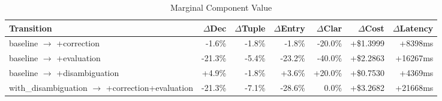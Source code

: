 \begin{table}[htbp]
\centering
\caption{Marginal Component Value}
\label{tab:marginal-deltas}
\begin{tabular}{l rrrr rr}
\toprule
Transition & $\Delta$Dec & $\Delta$Tuple & $\Delta$Entry & $\Delta$Clar & $\Delta$Cost & $\Delta$Latency \\
\midrule
  baseline $\to$ +correction & -1.6\% & -1.8\% & -1.8\% & -20.0\% & +\$1.3999 & +8398ms \\
  baseline $\to$ +evaluation & -21.3\% & -5.4\% & -23.2\% & -40.0\% & +\$2.2863 & +16267ms \\
  baseline $\to$ +disambiguation & +4.9\% & -1.8\% & +3.6\% & +20.0\% & +\$0.7530 & +4369ms \\
  with\_disambiguation $\to$ +correction+evaluation & -21.3\% & -7.1\% & -28.6\% & 0.0\% & +\$3.2682 & +21668ms \\
\bottomrule
\end{tabular}
\end{table}
